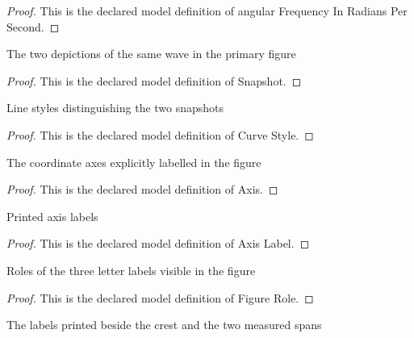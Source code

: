 \begin{proof}
  This is the declared model definition of angular Frequency In Radians Per Second.
\end{proof}
\begin{definition}[Snapshot]
  \label{def:physics:phyx-mini-0289:phyxminiproblems-problemphyxmini0289-snapshot}
  The two depictions of the same wave in the primary figure
\end{definition}
\begin{proof}
  This is the declared model definition of Snapshot.
\end{proof}
\begin{definition}
  \label{def:physics:phyx-mini-0289:phyxminiproblems-problemphyxmini0289-curvestyle}
  Line styles distinguishing the two snapshots
\end{definition}
\begin{proof}
  This is the declared model definition of Curve Style.
\end{proof}
\begin{definition}[Axis]
  \label{def:physics:phyx-mini-0289:phyxminiproblems-problemphyxmini0289-axis}
  The coordinate axes explicitly labelled in the figure
\end{definition}
\begin{proof}
  This is the declared model definition of Axis.
\end{proof}
\begin{definition}
  \label{def:physics:phyx-mini-0289:phyxminiproblems-problemphyxmini0289-axislabel}
  Printed axis labels
\end{definition}
\begin{proof}
  This is the declared model definition of Axis Label.
\end{proof}
\begin{definition}
  \label{def:physics:phyx-mini-0289:phyxminiproblems-problemphyxmini0289-figurerole}
  Roles of the three letter labels visible in the figure
\end{definition}
\begin{proof}
  This is the declared model definition of Figure Role.
\end{proof}
\begin{definition}
  \label{def:physics:phyx-mini-0289:phyxminiproblems-problemphyxmini0289-figurelabel}
  The labels printed beside the crest and the two measured spans
\end{definition}
